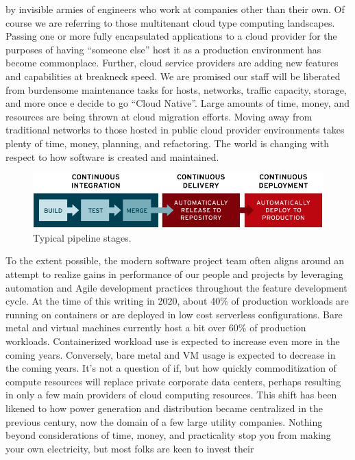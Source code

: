 by invisible armies of engineers who work at companies other than their own. Of course
we are referring to those multitenant cloud type computing landscapes. Passing
one or more fully encapsulated applications to a cloud provider for the purposes
of having ``someone else'' host it as a production environment has become
commonplace. Further, cloud service providers are adding new features and capabilities
at breakneck speed. We are promised our staff will be liberated from burdensome
maintenance tasks for hosts, networks, traffic capacity, storage, and more once
e decide to go ``Cloud Native''. Large amounts of time,
money, and resources are being thrown at cloud migration efforts. Moving away
from traditional networks to those hosted in public
cloud provider environments takes plenty of time, money, planning, and refactoring.
The world is changing with respect to how software is created and maintained.
\begin{figure}[!htb]
	\centering
	\includegraphics[scale=0.35]{../images/ci-cd-flow-desktop_0.png}
	\caption{Typical pipeline stages.}
\label{fig:stages}
\end{figure}
\justify{}
To the extent possible, the modern software project team often aligns around an
attempt to realize gains in performance of our people and projects by
leveraging automation and Agile development practices throughout the
feature development cycle.
\justify{}
At the time of this writing in 2020, about 40\% of production workloads are
running on containers or are deployed in low cost serverless configurations.
Bare metal and virtual machines currently host a bit over 60\% of production
workloads. Containerized workload use is expected to increase even more in
the coming years. Conversely, bare metal and VM usage is expected to
decrease in the coming years.
\justify{}
It's not a question of if, but how quickly commoditization of compute resources
will replace private corporate data centers, perhaps resulting in only a
few main providers of cloud computing resources. This shift has been likened
to how power generation and distribution became centralized
in the previous century, now the domain of a few large utility companies.
Nothing beyond considerations of time, money, and practicality stop you
from making your own electricity, but most folks are keen to invest their
